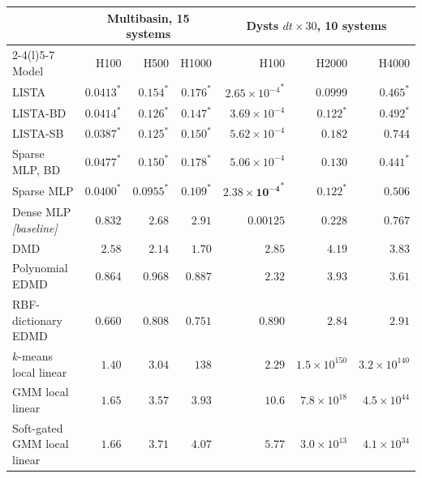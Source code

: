 \begin{tabular}[t]{@{}l rrr rrr@{}}
\toprule
& \multicolumn{3}{c}{Multibasin, 15 systems} & \multicolumn{3}{c}{Dysts \(dt{\times}30\), 10 systems} \\
\cmidrule(lr){2-4}\cmidrule(l){5-7}
Model & H100 & H500 & H1000 & H100 & H2000 & H4000 \\
\midrule
LISTA & ${0.0413}^{\ast}$ & ${0.154}^{\ast}$ & ${0.176}^{\ast}$ & ${2.65{\times}10^{-4}}^{\ast}$ & $\mathbf{0.0999}$ & ${0.465}^{\ast}$ \\
LISTA-BD & ${0.0414}^{\ast}$ & ${0.126}^{\ast}$ & ${0.147}^{\ast}$ & $3.69{\times}10^{-4}$ & ${0.122}^{\ast}$ & ${0.492}^{\ast}$ \\
LISTA-SB & ${\mathbf{0.0387}}^{\ast}$ & ${0.125}^{\ast}$ & ${0.150}^{\ast}$ & $5.62{\times}10^{-4}$ & $0.182$ & $0.744$ \\
Sparse MLP, BD & ${0.0477}^{\ast}$ & ${0.150}^{\ast}$ & ${0.178}^{\ast}$ & $5.06{\times}10^{-4}$ & $0.130$ & ${\mathbf{0.441}}^{\ast}$ \\
Sparse MLP \citep{fathi2024course} & ${0.0400}^{\ast}$ & ${\mathbf{0.0955}}^{\ast}$ & ${\mathbf{0.109}}^{\ast}$ & ${\mathbf{2.38{\times}10^{-4}}}^{\ast}$ & ${0.122}^{\ast}$ & $0.506$ \\
\midrule
Dense MLP \citep{lusch_deep_2018} \emph{[baseline]} & $0.832$ & $2.68$ & $2.91$ & $0.00125$ & $0.228$ & $0.767$ \\
\midrule
DMD & $2.58$ & $2.14$ & $1.70$ & $2.85$ & $4.19$ & $3.83$ \\
Polynomial EDMD & $0.864$ & $0.968$ & $0.887$ & $2.32$ & $3.93$ & $3.61$ \\
RBF-dictionary EDMD & $0.660$ & $0.808$ & $0.751$ & $0.890$ & $2.84$ & $2.91$ \\
$k$-means local linear & $1.40$ & $3.04$ & $138$ & $2.29$ & $1.5{\times}10^{150}$ & $3.2{\times}10^{140}$ \\
GMM local linear & $1.65$ & $3.57$ & $3.93$ & $10.6$ & $7.8{\times}10^{18}$ & $4.5{\times}10^{44}$ \\
Soft-gated GMM local linear & $1.66$ & $3.71$ & $4.07$ & $5.77$ & $3.0{\times}10^{13}$ & $4.1{\times}10^{34}$ \\
\bottomrule
\end{tabular}

